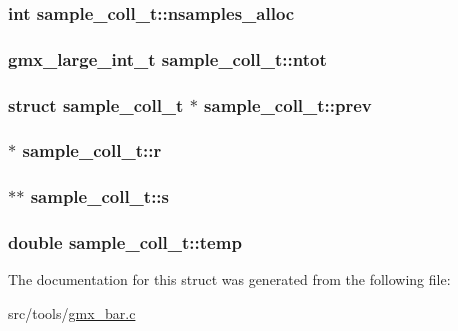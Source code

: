 \hypertarget{structsample__coll__t_a51ff911a9247187821b0745b5d059240}{
\subsubsection[{nsamples\-\_\-alloc}]{\setlength{\rightskip}{0pt plus 5cm}int {\bf sample\-\_\-coll\-\_\-t\-::nsamples\-\_\-alloc}}}\label{structsample__coll__t_a51ff911a9247187821b0745b5d059240}
\hypertarget{structsample__coll__t_a76b661b37e1068f43a9c41f95a6ef787}{
\subsubsection[{ntot}]{\setlength{\rightskip}{0pt plus 5cm}gmx\-\_\-large\-\_\-int\-\_\-t {\bf sample\-\_\-coll\-\_\-t\-::ntot}}}\label{structsample__coll__t_a76b661b37e1068f43a9c41f95a6ef787}
\hypertarget{structsample__coll__t_a2d147b0ed30dd26a1c0294689f06eaaf}{
\subsubsection[{prev}]{\setlength{\rightskip}{0pt plus 5cm}struct {\bf sample\-\_\-coll\-\_\-t} $\ast$ {\bf sample\-\_\-coll\-\_\-t\-::prev}}}\label{structsample__coll__t_a2d147b0ed30dd26a1c0294689f06eaaf}
\hypertarget{structsample__coll__t_acf4da45f3ec8d738199eccb76e6274f3}{
\subsubsection[{r}]{$\ast$ {\bf sample\-\_\-coll\-\_\-t\-::r}}}\label{structsample__coll__t_acf4da45f3ec8d738199eccb76e6274f3}
\hypertarget{structsample__coll__t_a1745ebd0a689532ddbaf90b93b7dcca8}{
\subsubsection[{s}]{$\ast$$\ast$ {\bf sample\-\_\-coll\-\_\-t\-::s}}}\label{structsample__coll__t_a1745ebd0a689532ddbaf90b93b7dcca8}
\hypertarget{structsample__coll__t_a49a66a28958741147fdd421f089d045f}{
\subsubsection[{temp}]{\setlength{\rightskip}{0pt plus 5cm}double {\bf sample\-\_\-coll\-\_\-t\-::temp}}}\label{structsample__coll__t_a49a66a28958741147fdd421f089d045f}


\-The documentation for this struct was generated from the following file\-:\begin{DoxyCompactItemize}
\item 
src/tools/\hyperlink{gmx__bar_8c}{gmx\-\_\-bar.\-c}\end{DoxyCompactItemize}
